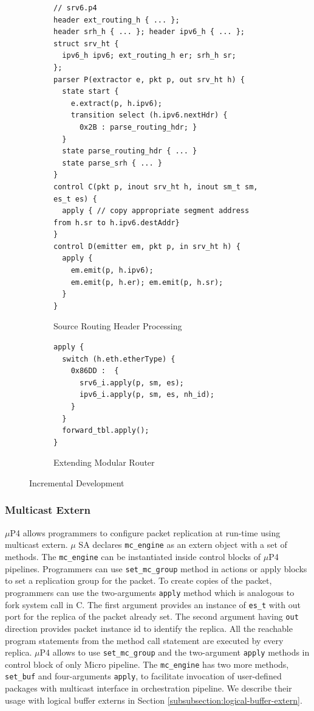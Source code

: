 \begin{figure}[!h]
\begin{subfigure}[b]{\linewidth}
 \begin{lstlisting}[frame=none]
// srv6.p4
header ext_routing_h { ... }; 
header srh_h { ... }; header ipv6_h { ... }; 
struct srv_ht { 
  ipv6_h ipv6; ext_routing_h er; srh_h sr;
};
parser P(extractor e, pkt p, out srv_ht h) {
  state start {
    e.extract(p, h.ipv6);
    transition select (h.ipv6.nextHdr) {
      0x2B : parse_routing_hdr; }
  }
  state parse_routing_hdr { ... }
  state parse_srh { ... }
}
control C(pkt p, inout srv_ht h, inout sm_t sm, es_t es) {
  apply { // copy appropriate segment address from h.sr to h.ipv6.destAddr}
}
control D(emitter em, pkt p, in srv_ht h) {
  apply { 
    em.emit(p, h.ipv6);
    em.emit(p, h.er); em.emit(p, h.sr);
  }
}
\end{lstlisting}
\caption{Source Routing Header Processing}
\end{subfigure}
\begin{subfigure}[b]{\linewidth}
 \begin{lstlisting}[frame=none]
apply {
  switch (h.eth.etherType) {
    0x86DD :  { 
      srv6_i.apply(p, sm, es);
      ipv6_i.apply(p, sm, es, nh_id);
    }
  }
  forward_tbl.apply(); 
}
\end{lstlisting}
\caption{Extending Modular Router}
\end{subfigure}
\label{fig:multi-packe}
\caption{Incremental Development}
\end{figure}

\subsubsection{Multicast Extern}
\label{subsubsection:multicast-extern}
$\mu$P4 allows programmers to configure packet replication at run-time using multicast extern.
$\mu$ SA declares \texttt{mc\_engine} as an extern object with a set of methods.
The \texttt{mc\_engine} can be instantiated inside control blocks of $\mu$P4 pipelines.
Programmers can use \texttt{set\_mc\_group} method in actions or apply blocks to set a replication group for the packet.
To create copies of the packet, programmers can use the two-arguments \texttt{apply} method which is analogous to fork system call in C. 
The first argument provides an instance of \texttt{es\_t} with out port for the replica of the packet already set.
The second argument having \texttt{out} direction provides packet instance id to identify the replica.
All the reachable program statements from the method call statement are executed by every replica.
$\mu$P4 allows to use \texttt{set\_mc\_group} and the two-argument \texttt{apply} methods in control block of only Micro pipeline.
The \texttt{mc\_engine} has two more methods, \texttt{set\_buf} and four-arguments \texttt{apply}, to facilitate invocation of user-defined packages with multicast interface in orchestration pipeline.
We describe their usage with logical buffer externs in Section \ref{subsubsection:logical-buffer-extern}.

